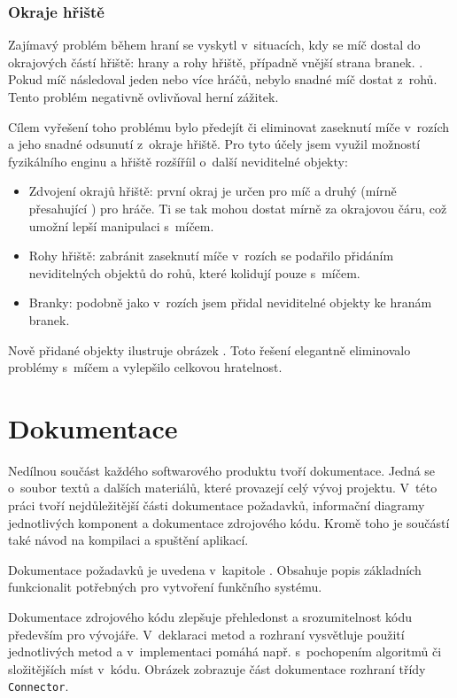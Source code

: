 \documentclass[thesis=B,czech,hidelinks]{FITthesis}[2012/06/26] %
\newcommand{\code}[1]{\texttt{#1}}
\begin{document}
\subsubsection{Okraje hřiště}

Zajímavý problém během hraní se vyskytl v~situacích, kdy se míč dostal do okrajových částí hřiště: hrany a rohy hřiště, případně vnější strana branek. . Pokud míč následoval jeden nebo více hráčů, nebylo snadné míč dostat z~rohů. Tento problém negativně ovlivňoval herní zážitek.

Cílem vyřešení toho problému bylo předejít či eliminovat zaseknutí míče v~rozích a jeho snadné odsunutí z~okraje hřiště. Pro tyto účely jsem využil možností fyzikálního enginu a hřiště rozšíříil o~další neviditelné objekty:

\begin{itemize}
	\item Zdvojení okrajů hřiště: první okraj je určen pro míč a druhý (mírně přesahující ) pro hráče. Ti se tak mohou dostat mírně za okrajovou čáru, což umožní lepší manipulaci s~míčem.
	\item Rohy hřiště: zabránit zaseknutí míče v~rozích se podařilo přidáním neviditelných objektů do rohů, které kolidují pouze s~míčem.
	\item Branky: podobně jako v~rozích jsem přidal neviditelné objekty ke hranám branek.
\end{itemize}

Nově přidané objekty ilustruje obrázek . Toto řešení elegantně eliminovalo problémy s~míčem a vylepšilo celkovou hratelnost.


\section{Dokumentace}

Nedílnou součást každého softwarového produktu tvoří dokumentace. Jedná se o~soubor textů a dalších materiálů, které provazejí celý vývoj projektu. V~této práci tvoří nejdůležitější části dokumentace požadavků, informační diagramy jednotlivých komponent a dokumentace zdrojového kódu. Kromě toho je součástí také návod na kompilaci a spuštění aplikací.

Dokumentace požadavků je uvedena v~kapitole \label{section:requirements}. Obsahuje popis základních funkcionalit potřebných pro vytvoření funkčního systému.

Dokumentace zdrojového kódu zlepšuje přehledonst a srozumitelnost kódu především pro vývojáře. V~deklaraci metod a rozhraní vysvětluje použití jednotlivých metod a v~implementaci pomáhá např. s~pochopením algoritmů či složitějších míst v~kódu. Obrázek  zobrazuje část dokumentace rozhraní třídy \code{Connector}. 
\end{document}
